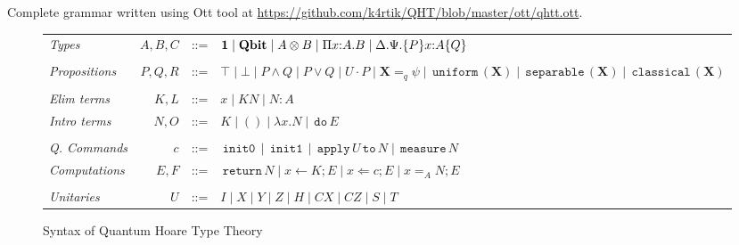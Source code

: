 \documentclass[acmsmall,nonacm,timestamp,review=false,anonymous=false]{acmart}
\newcommand{\type}[1]{\textrm{\textbf{#1}}}
\newcommand{\kw}[1]{\,\mathrm{\texttt{#1}}\,}
\begin{document}
Complete grammar written using Ott tool at \url{https://github.com/k4rtik/QHT/blob/master/ott/qhtt.ott}.

\begin{figure}[ht]
	\begin{tabular}{lrcl}
		\textit{Types} & $A, B, C$ & ::= &
		\begin{minipage}[t]{0.5\columnwidth}%
			$ \type{1} \mid \type{Qbit} \mid A \otimes B \mid \Pi x{ : }A.B \mid \Delta. \Psi .\{P\} x{ : }A \{Q\}$
		\end{minipage}\\ \\
		\textit{Propositions} & $P, Q, R$ & ::= &
		\begin{minipage}[t]{0.5\columnwidth}%
			$ \top \mid \bot \mid P \wedge Q \mid P \vee Q \mid U \cdot P \mid \textbf{X} =_q \psi \mid \kw{uniform}(\textbf{X}) \mid \kw{separable}(\textbf{X}) \mid \kw{classical}(\textbf{X}) $
		\end{minipage}\\ \\
		\textit{Elim terms} & $K, L$ & ::= & $ x \mid K N \mid N : A $\\
		\textit{Intro terms} & $N, O$ & ::= & $ K \mid () \mid \lambda x.N \mid \kw{do} E $\\ \\
		\textit{Q. Commands} & $c$ & ::= &
		\begin{minipage}[t]{0.5\columnwidth}%
			$ \kw{init0} \mid \kw{init1} \mid \kw{apply} U \kw{to} N \mid \kw{measure} N$
		\end{minipage}\\
		\textit{Computations} & $E, F$ & ::= & $ \kw{return} N \mid x \leftarrow K; E \mid x \Leftarrow c; E \mid x =_A N; E $\\ \\
		\textit{Unitaries} & $U$ & ::= & $ I \mid X \mid Y \mid Z \mid H \mid CX \mid CZ \mid S \mid T$
	\end{tabular}
	\caption{Syntax of Quantum Hoare Type Theory}
	\label{fig:syntax}
\end{figure}
\end{document}

